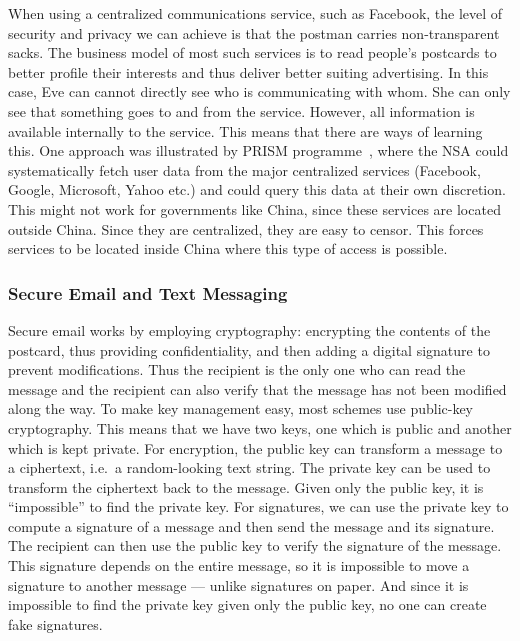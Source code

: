When using a centralized communications service, such as Facebook, the
level of security and privacy we can achieve is that the postman
carries non-transparent sacks.  The business model of most such
services is to read people's postcards to better profile their
interests and thus deliver better suiting advertising.
In this case, Eve can cannot directly see who is communicating with whom.
She can only see that something goes to and from the service.
However, all information is available
internally to the service.  This means that there are ways of learning
this.
One approach was illustrated by  PRISM programme~\cite{Prism}, where 
the \ac{NSA} could systematically fetch user data from the major centralized 
services (Facebook, Google, Microsoft, Yahoo etc.) and could query this data at 
their own discretion.
This might not work for governments like China, since these services are 
located outside China.
Since they are centralized, they are easy to censor.
This forces services to be located inside China where this type of access is 
possible.

\subsubsection{Secure Email and Text Messaging}

Secure email works by employing cryptography:  encrypting the contents of the 
postcard, thus providing confidentiality, and then adding a digital signature to 
prevent modifications.
Thus the recipient is the only one who can read the message and the recipient 
can also verify that the message has not been modified along the way.
To make key management easy, most schemes use public-key cryptography.
This means that we have two keys, one which is public and another which is kept
private.
For encryption, the public key can transform a message to a ciphertext, i.e.\ 
a random-looking text string.
The private key can be used to transform the ciphertext back to the message.
Given only the public key, it is \enquote{impossible} to find the private key.
For signatures, we can use the private key to compute a signature of a message 
and then send the message and its signature.
The recipient can then use the public key to verify the signature of the 
message.
This signature depends on the entire message, so it is impossible to move 
a signature to another message --- unlike signatures on paper.
And since it is impossible to find the private key given only the public key, 
no one can create fake signatures.

